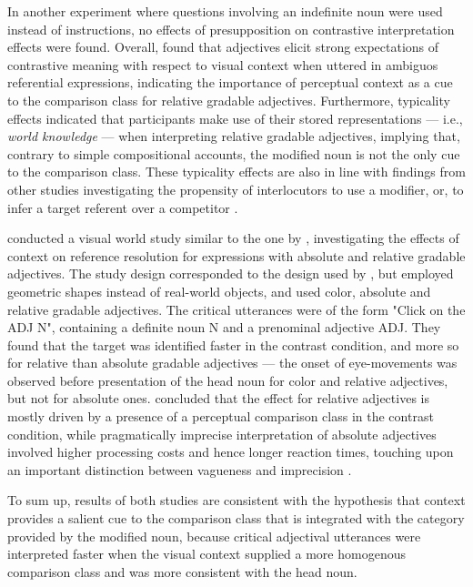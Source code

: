  In another experiment where questions involving an indefinite noun were used instead of instructions,  no effects of presupposition on contrastive interpretation effects were found.
 Overall, \textcite{sedivy1999} found that adjectives elicit strong expectations of contrastive meaning with respect to visual context when uttered in ambiguos referential expressions, indicating the importance of perceptual context as a cue to the comparison class for relative gradable adjectives. Furthermore, typicality effects indicated that participants make use of their stored representations --- i.e., \textit{world knowledge} --- when interpreting relative gradable adjectives, implying that, contrary to simple compositional accounts, the modified noun is not the only cue to the comparison class. 
These typicality effects are also in line with findings from other studies investigating the propensity of interlocutors to use a modifier, or, to infer a target referent over a competitor \parencite{KreissDegen2020, bergey2020}.
  
\textcite{Aparicio2016} conducted a visual world study similar to the one by \textcite{sedivy1999}, investigating the effects of context on reference resolution for expressions with absolute and relative gradable adjectives. 
The study design corresponded to the design used by \parencite{sedivy1999}, but employed geometric shapes instead of real-world objects, and used color, absolute and relative gradable adjectives.  The critical utterances were of the form "Click on the ADJ N", containing a definite noun N and a prenominal adjective ADJ. They found that the target was identified faster in the contrast condition, and more so for relative than absolute gradable adjectives --- the onset of eye-movements was observed before presentation of the head noun for color and relative adjectives, but not for absolute ones. \textcite{Aparicio2016} concluded that the effect for relative adjectives is mostly driven by a presence of a perceptual comparison class in the contrast condition, while pragmatically imprecise interpretation of absolute adjectives involved higher processing costs and hence longer reaction times, touching upon an important distinction between vagueness and imprecision \parencite[cf.][]{Kennedy2007}. 

 To sum up, results of both studies are consistent with the  hypothesis that context provides a salient cue to the comparison class that is integrated with the category provided by the modified  noun, because critical adjectival utterances were interpreted faster when the visual context supplied a more homogenous comparison class and was more consistent with the head noun. 

